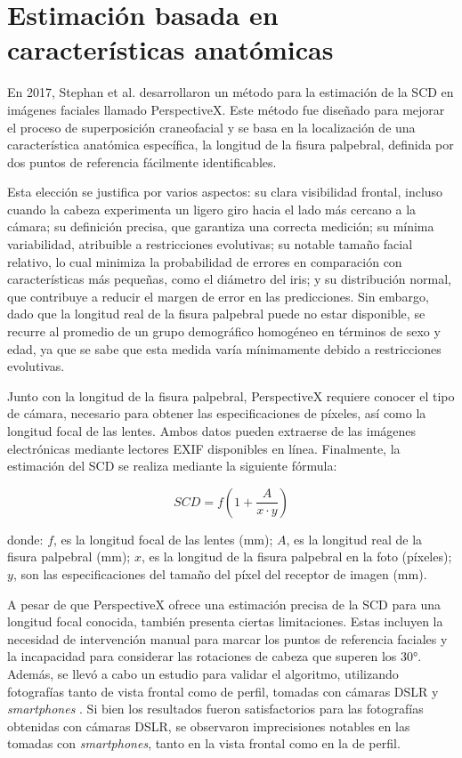 \section{Estimación basada en características anatómicas}

En 2017, Stephan et al. \cite{20} desarrollaron un método para la estimación de la SCD en imágenes faciales llamado PerspectiveX. Este método fue diseñado para mejorar el proceso de superposición craneofacial y se basa en la localización de una característica anatómica específica, la longitud de la fisura palpebral, definida por dos puntos de referencia fácilmente identificables. 

Esta elección se justifica por varios aspectos: su clara visibilidad frontal, incluso cuando la cabeza experimenta un ligero giro hacia el lado más cercano a la cámara; su definición precisa, que garantiza una correcta medición; su mínima variabilidad, atribuible a restricciones evolutivas; su notable tamaño facial relativo, lo cual minimiza la probabilidad de errores en comparación con características más pequeñas, como el diámetro del iris; y su distribución normal, que contribuye a reducir el margen de error en las predicciones. Sin embargo, dado que la longitud real de la fisura palpebral puede no estar disponible, se recurre al promedio de un grupo demográfico homogéneo en términos de sexo y edad, ya que se sabe que esta medida varía mínimamente debido a restricciones evolutivas.

Junto con la longitud de la fisura palpebral, PerspectiveX requiere conocer el tipo de cámara, necesario para obtener las especificaciones de píxeles, así como la longitud focal de las lentes. Ambos datos pueden extraerse de las imágenes electrónicas mediante lectores EXIF disponibles en línea. Finalmente, la estimación del SCD se realiza mediante la siguiente fórmula:

\begin{equation}
	SCD = f (1+\frac{A}{x \cdot y})
\end{equation}

donde: $f$, es la longitud focal de las lentes (mm); $A$, es la longitud real de la fisura palpebral (mm); $x$, es la longitud de la fisura palpebral en la foto (píxeles); $y$, son las especificaciones del tamaño del píxel del receptor de imagen (mm).

A pesar de que PerspectiveX ofrece una estimación precisa de la SCD para una longitud focal conocida, también presenta ciertas limitaciones. Estas incluyen la necesidad de intervención manual para marcar los puntos de referencia faciales y la incapacidad para considerar las rotaciones de cabeza que superen los 30°. Además, se llevó a cabo un estudio para validar el algoritmo, utilizando fotografías tanto de vista frontal como de perfil, tomadas con cámaras DSLR y \textit{smartphones} \cite{70}. Si bien los resultados fueron satisfactorios para las fotografías obtenidas con cámaras DSLR, se observaron imprecisiones notables en las tomadas con \textit{smartphones}, tanto en la vista frontal como en la de perfil.


